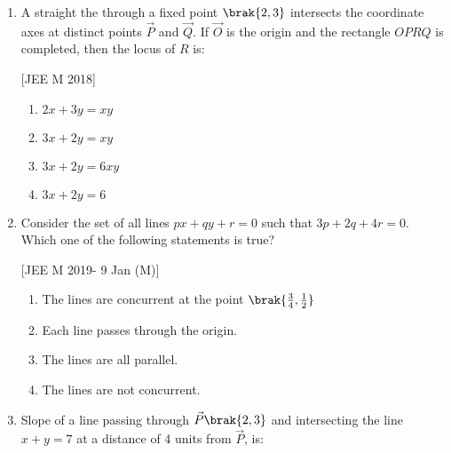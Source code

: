 \begin{enumerate}
\item A straight the through a fixed point $\brak{2, 3}$ intersects the 
	coordinate axes at distinct points $\vec{P}$ and $\vec{Q}$. If $\vec{O}$ is the origin 
and the rectangle $OPRQ$ is completed, then the locus of $R$ is: 

\hfill{[JEE M 2018]}
\begin{multicols}{2}
\begin{enumerate}
\item $2x+3y = xy$
\item $3x+2y = xy$ 
\item $3x+2y = 6xy$ 
\item $3x+2y = 6$
\end{enumerate}
\end{multicols}

\item Consider the set of all lines $px+qy+r=0$ such that 
$3p+2q+4r=0$. Which one of the following statements is true? 

\hfill{[JEE M 2019- 9 Jan (M)]}
\begin{enumerate}
\item The lines are concurrent at the point $\brak{\frac{3}{4}, \frac{1}{2}}$
\item Each line passes through the origin. 
\item The lines are all parallel.
\item The lines are not concurrent.
\end{enumerate}

\item Slope of a line passing through $\vec{P}\brak{2, 3}$ and intersecting the line $x+y=7$ at a distance of 4 units from $\vec{P}$, is:


\end{enumerate}
